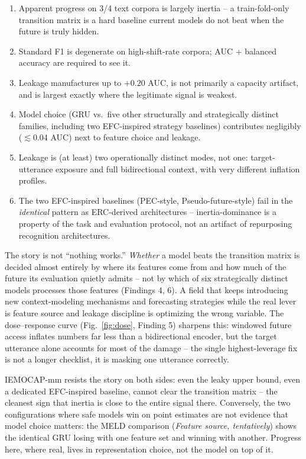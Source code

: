 \documentclass[conference]{IEEEtran}
\begin{document}
\begin{enumerate}
\item Apparent progress on 3/4 text corpora is largely inertia -- a train-fold-only transition
matrix is a hard baseline current models do not beat when the future is truly hidden.
\item Standard F1 is degenerate on high-shift-rate corpora; AUC + balanced accuracy are required to
see it.
\item Leakage manufactures up to $+0.20$ AUC, is not primarily a capacity artifact, and is largest
exactly where the legitimate signal is weakest.
\item Model choice (GRU vs.\ five other structurally and strategically distinct families, including
two EFC-inspired strategy baselines) contributes negligibly ($\lesssim$0.04 AUC) next to feature choice and
leakage.
\item Leakage is (at least) two operationally distinct modes, not one: target-utterance exposure
and full bidirectional context, with very different inflation profiles.
\item The two EFC-inspired baselines (PEC-style, Pseudo-future-style) fail in the \emph{identical} pattern
as ERC-derived architectures -- inertia-dominance is a property of the task and evaluation
protocol, not an artifact of repurposing recognition architectures.
\end{enumerate}

The story is not ``nothing works.'' \emph{Whether} a model beats the transition matrix is decided
almost entirely by where its features come from and how much of the future its evaluation quietly
admits -- not by which of six strategically distinct models processes those features (Findings 4,
6). A field that keeps introducing new context-modeling mechanisms and forecasting strategies while
the real lever is feature source and leakage discipline is optimizing the wrong variable. The dose--response
curve (Fig.~\ref{fig:dose}, Finding 5) sharpens this: windowed future access inflates numbers far
less than a bidirectional encoder, but the target utterance alone accounts for most of the damage
-- the single highest-leverage fix is not a longer checklist, it is masking one utterance
correctly.

IEMOCAP-mm resists the story on both sides: even the leaky upper bound, even a dedicated
EFC-inspired baseline, cannot clear the transition matrix -- the cleanest sign that inertia is
close to the entire signal there. Conversely, the two configurations where safe models win on
point estimates are not evidence that model choice matters: the MELD comparison (\emph{Feature
source, tentatively}) shows the identical GRU losing with one feature set and winning with
another. Progress here, where real, lives in representation choice, not the model on top of it.
\end{document}
